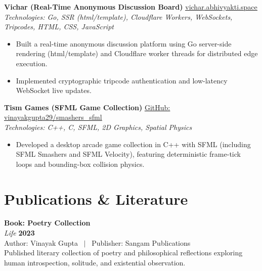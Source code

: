 \documentclass[10pt,a4paper]{article}
\begin{document}
\vspace{3pt}
\textbf{Vichar (Real-Time Anonymous Discussion Board)} \hfill \href{https://vichar.abhivyakti.space}{\underline{vichar.abhivyakti.space}} \\
\textit{Technologies: Go, SSR (html/template), Cloudflare Workers, WebSockets, Tripcodes, HTML, CSS, JavaScript}
\begin{itemize}
  \item Built a real-time anonymous discussion platform using Go server-side rendering (html/template) and Cloudflare worker threads for distributed edge execution.
  \item Implemented cryptographic tripcode authentication and low-latency WebSocket live updates.
\end{itemize}

\vspace{3pt}
\textbf{Tism Games (SFML Game Collection)} \hfill \href{https://github.com/vinayakgupta29/smashers_sfml}{\underline{GitHub: vinayakgupta29/smashers\_sfml}} \\
\textit{Technologies: C++, C, SFML, 2D Graphics, Spatial Physics}
\begin{itemize}
  \item Developed a desktop arcade game collection in C++ with SFML (including SFML Smashers and SFML Velocity), featuring deterministic frame-tick loops and bounding-box collision physics.
\end{itemize}

\section*{Publications \& Literature}

\textbf{Book: Poetry Collection} \\
\textit{Life} \hfill \textbf{2023} \\
Author: Vinayak Gupta \ $\vert$ \ Publisher: Sangam Publications \\
\small Published literary collection of poetry and philosophical reflections exploring human introspection, solitude, and existential observation.

\vspace{3pt}
\end{document}
